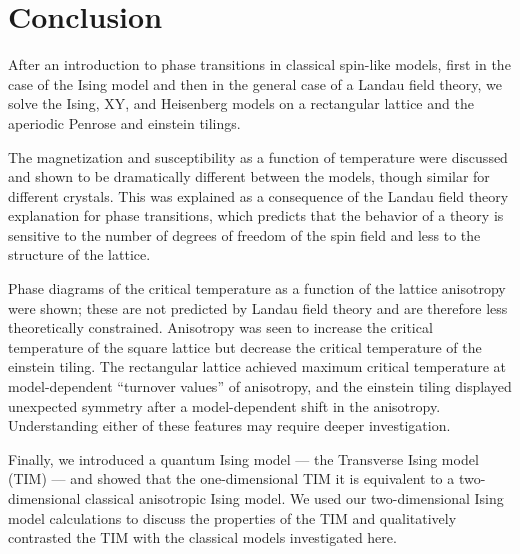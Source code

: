 \documentclass[
  amsmath,
  amssymb,
  aps,
  twocolumn,
  nofootinbib,
  nolongbibliography,
  floatfix,
]{revtex4-2}
\begin{document}
\section{Conclusion}
\label{sec:conclusion}
After an introduction to phase transitions in classical spin-like models, first in the case of the Ising model and then in the general case of a Landau field theory, we solve the Ising, XY, and Heisenberg models on a rectangular lattice and the aperiodic Penrose and einstein tilings.

The magnetization and susceptibility as a function of temperature were discussed and shown to be dramatically different between the models, though similar for different crystals. This was explained as a consequence of the Landau field theory explanation for phase transitions, which predicts that the behavior of a theory is sensitive to the number of degrees of freedom of the spin field and less to the structure of the lattice.

Phase diagrams of the critical temperature as a function of the lattice anisotropy were shown; these are not predicted by Landau field theory and are therefore less theoretically constrained.  Anisotropy was seen to increase the critical temperature of the square lattice but decrease the critical temperature of the einstein tiling. The rectangular lattice achieved maximum critical temperature at model-dependent ``turnover values'' of anisotropy, and the einstein tiling displayed unexpected symmetry after a model-dependent shift in the anisotropy. Understanding either of these features may require deeper investigation.

Finally, we introduced a quantum Ising model --- the Transverse Ising model (TIM) --- and showed that the one-dimensional TIM it is equivalent to a two-dimensional classical anisotropic Ising model. We used our two-dimensional Ising model calculations to discuss the properties of the TIM and qualitatively contrasted the TIM with the classical models investigated here.


\end{document}
